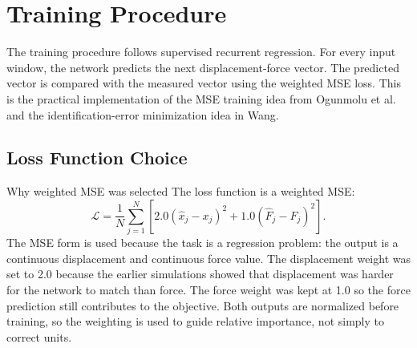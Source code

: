 \documentclass[11pt]{article}
\begin{document}
\section{Training Procedure}
The training procedure follows supervised recurrent regression. For every input window, the network predicts the next displacement-force vector. The predicted vector is compared with the measured vector using the weighted MSE loss. This is the practical implementation of the MSE training idea from Ogunmolu et al. and the identification-error minimization idea in Wang.

\subsection{Loss Function Choice}
\begin{trainingdecisionbox}{Why weighted MSE was selected}
The loss function is a weighted MSE:
\begin{equation}
\mathcal{L}=\frac{1}{N}\sum_{j=1}^{N}\left[2.0\left(\hat{x}_j-x_j\right)^2+1.0\left(\hat{F}_j-F_j\right)^2\right].
\end{equation}
The MSE form is used because the task is a regression problem: the output is a continuous displacement and continuous force value. The displacement weight was set to 2.0 because the earlier simulations showed that displacement was harder for the network to match than force. The force weight was kept at 1.0 so the force prediction still contributes to the objective. Both outputs are normalized before training, so the weighting is used to guide relative importance, not simply to correct units.
\end{trainingdecisionbox}
\end{document}
